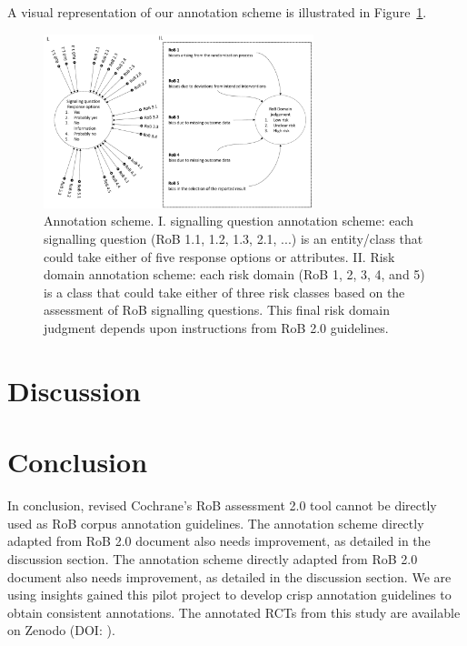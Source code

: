 \documentclass{IOS-Book-Article}
\begin{document}
A visual representation of our annotation scheme is illustrated in Figure~\ref{fig:ann_scheme}. 
%
\begin{figure}[ht]
    \centering
    \includegraphics[width=0.70\textwidth]{Figures/figures2.pdf}
    \caption{Annotation scheme. I. signalling question annotation scheme: each signalling question (RoB 1.1, 1.2, 1.3, 2.1, ...) is an entity/class that could take either of five response options or attributes. II. Risk domain annotation scheme: each risk domain (RoB 1, 2, 3, 4, and 5) is a class that could take either of three risk classes based on the assessment of RoB signalling questions. This final risk domain judgment depends upon instructions from RoB 2.0 guidelines.}
    \label{fig:ann_scheme}
\end{figure}
%
%
%
\section{Discussion}

\section{Conclusion}
\label{sec:conclusion}
%
In conclusion, revised Cochrane's RoB assessment 2.0 tool cannot be directly used as RoB corpus annotation guidelines.
The annotation scheme directly adapted from RoB 2.0 document also needs improvement, as detailed in the discussion section.
The annotation scheme directly adapted from RoB 2.0 document also needs improvement, as detailed in the discussion section.
We are using insights gained this pilot project to develop crisp annotation guidelines to obtain consistent annotations.
The annotated RCTs from this study are available on Zenodo (DOI: ).
%
%
%
 
%
%

%
\end{document}
